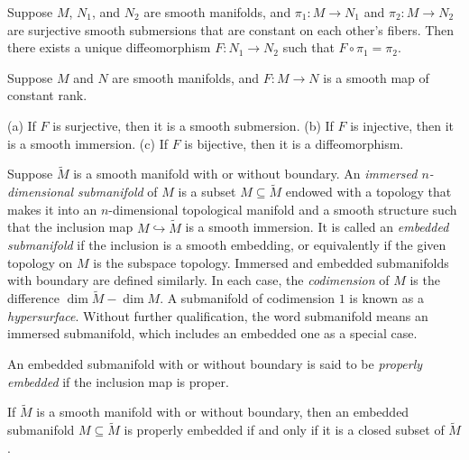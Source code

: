 \begin{proposition}
\label{prop:uniqueness-smooth-quotients}
Suppose $M$, $N_1$, and $N_2$ are smooth manifolds, and $\pi_1 : M \to N_1$ and $\pi_2 : M \to N_2$ are surjective smooth submersions that are constant on each other's fibers. Then there exists a unique diffeomorphism $F : N_1 \to N_2$ such that $F \circ \pi_1 = \pi_2$.
\end{proposition}

\begin{theorem}
\label{thm:global-rank-theorem}
Suppose $M$ and $N$ are smooth manifolds, and $F : M \to N$ is a smooth map of constant rank.

(a) If $F$ is surjective, then it is a smooth submersion.
(b) If $F$ is injective, then it is a smooth immersion.
(c) If $F$ is bijective, then it is a diffeomorphism.
\end{theorem}

Suppose $\tilde{M}$ is a smooth manifold with or without boundary. An \emph{immersed $n$-dimensional submanifold} of $M$ is a subset $M \subseteq \tilde{M}$ endowed with a topology that makes it into an $n$-dimensional topological manifold and a smooth structure such that the inclusion map $M \hookrightarrow \tilde{M}$ is a smooth immersion. It is called an \emph{embedded submanifold} if the inclusion is a smooth embedding, or equivalently if the given topology on $M$ is the subspace topology. Immersed and embedded submanifolds with boundary are defined similarly. In each case, the \emph{codimension} of $M$ is the difference $\dim \tilde{M} - \dim M$. A submanifold of codimension $1$ is known as a \emph{hypersurface}. Without further qualification, the word submanifold means an immersed submanifold, which includes an embedded one as a special case.

An embedded submanifold with or without boundary is said to be \emph{properly embedded} if the inclusion map is proper.

\begin{proposition}
\label{prop:properly-embedded-closed}
If $\tilde{M}$ is a smooth manifold with or without boundary, then an embedded submanifold $M \subseteq \tilde{M}$ is properly embedded if and only if it is a closed subset of $\tilde{M}$.
\end{proposition}

